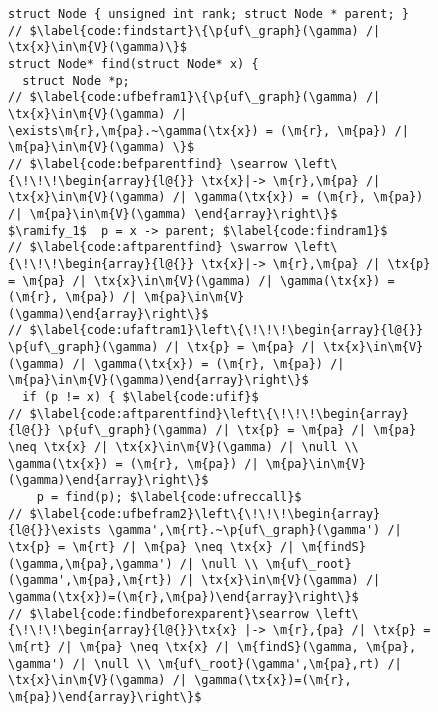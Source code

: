 \begin{figure}[t]
\vspace{-1ex}
  \begin{lstlisting}
struct Node { unsigned int rank; struct Node * parent; }
// $\label{code:findstart}\{\p{uf\_graph}(\gamma) /| \tx{x}\in\m{V}(\gamma)\}$
struct Node* find(struct Node* x) {
  struct Node *p;
// $\label{code:ufbefram1}\{\p{uf\_graph}(\gamma) /| \tx{x}\in\m{V}(\gamma) /| \exists\m{r},\m{pa}.~\gamma(\tx{x}) = (\m{r}, \m{pa}) /| \m{pa}\in\m{V}(\gamma) \}$
// $\label{code:befparentfind} \searrow \left\{\!\!\!\begin{array}{l@{}} \tx{x}|-> \m{r},\m{pa} /| \tx{x}\in\m{V}(\gamma) /| \gamma(\tx{x}) = (\m{r}, \m{pa}) /| \m{pa}\in\m{V}(\gamma) \end{array}\right\}$
$\ramify_1$  p = x -> parent; $\label{code:findram1}$
// $\label{code:aftparentfind} \swarrow \left\{\!\!\!\begin{array}{l@{}} \tx{x}|-> \m{r},\m{pa} /| \tx{p} = \m{pa} /| \tx{x}\in\m{V}(\gamma) /| \gamma(\tx{x}) = (\m{r}, \m{pa}) /| \m{pa}\in\m{V}(\gamma)\end{array}\right\}$
// $\label{code:ufaftram1}\left\{\!\!\!\begin{array}{l@{}} \p{uf\_graph}(\gamma) /| \tx{p} = \m{pa} /| \tx{x}\in\m{V}(\gamma) /| \gamma(\tx{x}) = (\m{r}, \m{pa}) /| \m{pa}\in\m{V}(\gamma)\end{array}\right\}$
  if (p != x) { $\label{code:ufif}$
// $\label{code:aftparentfind}\left\{\!\!\!\begin{array}{l@{}} \p{uf\_graph}(\gamma) /| \tx{p} = \m{pa} /| \m{pa} \neq \tx{x} /| \tx{x}\in\m{V}(\gamma) /| \null \\ \gamma(\tx{x}) = (\m{r}, \m{pa}) /| \m{pa}\in\m{V}(\gamma)\end{array}\right\}$
    p = find(p); $\label{code:ufreccall}$
// $\label{code:ufbefram2}\left\{\!\!\!\begin{array}{l@{}}\exists \gamma',\m{rt}.~\p{uf\_graph}(\gamma') /| \tx{p} = \m{rt} /| \m{pa} \neq \tx{x} /| \m{findS}(\gamma,\m{pa},\gamma') /| \null \\ \m{uf\_root}(\gamma',\m{pa},\m{rt}) /| \tx{x}\in\m{V}(\gamma) /| \gamma(\tx{x})=(\m{r},\m{pa})\end{array}\right\}$
// $\label{code:findbeforexparent}\searrow \left\{\!\!\!\begin{array}{l@{}}\tx{x} |-> \m{r},{pa} /| \tx{p} = \m{rt} /| \m{pa} \neq \tx{x} /| \m{findS}(\gamma, \m{pa}, \gamma') /| \null \\ \m{uf\_root}(\gamma',\m{pa},rt) /| \tx{x}\in\m{V}(\gamma) /| \gamma(\tx{x})=(\m{r}, \m{pa})\end{array}\right\}$

\end{lstlisting}
\end{figure}
